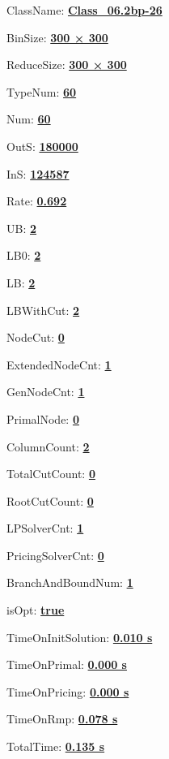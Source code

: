 \documentclass[11pt]{article}
\begin{document}
\pagestyle{empty}


ClassName: \underline{\textbf{Class_06.2bp-26}}
\par
BinSize: \underline{\textbf{300 × 300}}
\par
ReduceSize: \underline{\textbf{300 × 300}}
\par
TypeNum: \underline{\textbf{60}}
\par
Num: \underline{\textbf{60}}
\par
OutS: \underline{\textbf{180000}}
\par
InS: \underline{\textbf{124587}}
\par
Rate: \underline{\textbf{0.692}}
\par
UB: \underline{\textbf{2}}
\par
LB0: \underline{\textbf{2}}
\par
LB: \underline{\textbf{2}}
\par
LBWithCut: \underline{\textbf{2}}
\par
NodeCut: \underline{\textbf{0}}
\par
ExtendedNodeCnt: \underline{\textbf{1}}
\par
GenNodeCnt: \underline{\textbf{1}}
\par
PrimalNode: \underline{\textbf{0}}
\par
ColumnCount: \underline{\textbf{2}}
\par
TotalCutCount: \underline{\textbf{0}}
\par
RootCutCount: \underline{\textbf{0}}
\par
LPSolverCnt: \underline{\textbf{1}}
\par
PricingSolverCnt: \underline{\textbf{0}}
\par
BranchAndBoundNum: \underline{\textbf{1}}
\par
isOpt: \underline{\textbf{true}}
\par
TimeOnInitSolution: \underline{\textbf{0.010 s}}
\par
TimeOnPrimal: \underline{\textbf{0.000 s}}
\par
TimeOnPricing: \underline{\textbf{0.000 s}}
\par
TimeOnRmp: \underline{\textbf{0.078 s}}
\par
TotalTime: \underline{\textbf{0.135 s}}
\par
\newpage
\end{document}
